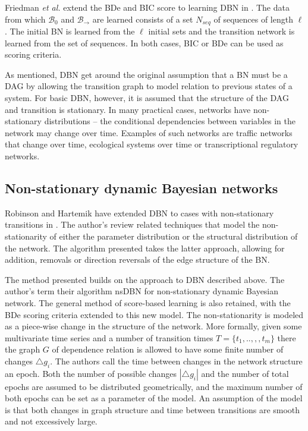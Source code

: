     
    Friedman \textit{et al.} extend the BDe and BIC score
    to learning DBN in  \cite{Robinson2010}. 
    The data from which $ \mathcal{B_0}$
    and $\mathcal{B}_{\rightarrow}$ are learned consists of 
    a set $N_{seq}$ of sequences of length $\ell$. 
    The initial BN is learned from the $\ell$ initial sets
    and the transition network is learned from the set of sequences. 
    In both cases, BIC or BDe can be used as scoring criteria.

    As mentioned, DBN get around the original assumption that 
    a BN must be a DAG by allowing the transition graph
    to model relation to previous states of a system. For
    basic DBN, however, it is assumed that the
    structure of the DAG and transition is stationary.  
    In many practical cases, networks have non-stationary distributions
    -- the conditional dependencies between variables in the 
    network may change over time. Examples of such networks 
    are traffic networks that change over time, ecological systems
    over time or transcriptional regulatory networks\cite{Robinson2010}. 

    \subsection{Non-stationary dynamic Bayesian networks}
 
    Robinson and Hartemik have extended DBN to cases with non-stationary
    transitions in \cite{Robinson2010}. The author's review related techniques
    that model the non-stationarity of either the parameter distribution 
    or the structural distribution of the network. The algorithm presented
    takes the latter approach, allowing for addition, removals or
    direction reversals of the edge structure of the BN.


    The method presented builds on the approach to DBN described
    above. The author's term
    their algorithm nsDBN for non-stationary dynamic Bayesian network.
    The general method of score-based learning is also 
    retained, with the  BDe scoring criteria
    extended to this new model. The non-stationarity is modeled
    as a piece-wise change in the structure of the network. 
    More formally, given some multivariate time series and a 
    number of transition times $ T = \{ t_1,..,,, t_m \}$
    there the graph $G$ of dependence relation is allowed
    to have some finite number of changes $\triangle g_i$. 
    The authors call the time between changes in the network
    structure an epoch. Both the number of possible changes
     $|\triangle g_i |$ and the number of total epochs are
     assumed to be distributed geometrically, and the maximum
     number of both epochs can be set as a parameter of the 
     model. An assumption of the model is that both changes in 
     graph structure and time between transitions are smooth and
     not excessively large. 

